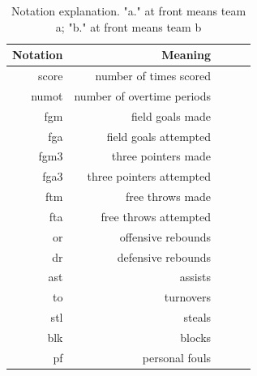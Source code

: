 \documentclass{article} %
\begin{document}
\begin{table}[H]
\centering
{\small
\begin{tabular}{rrrrr}
  \hline
 Notation & Meaning \\ 
  \hline
  score & number of times scored \\
  numot & number of overtime periods \\
  fgm  & field goals made \\ 
  fga  & field goals attempted \\ 
  fgm3 &  three pointers made \\ 
  fga3 &  three pointers attempted \\ 
  ftm &  free throws made \\ 
  fta &  free throws attempted \\
  or & offensive rebounds \\
  dr & defensive rebounds \\
  ast & assists \\
  to & turnovers \\
  stl &  steals \\
  blk & blocks \\
  pf & personal fouls \\
   \hline
\end{tabular}
}
\caption{Notation explanation. "a." at front means team a; "b." at front means team b} 
\end{table}
\end{document}
